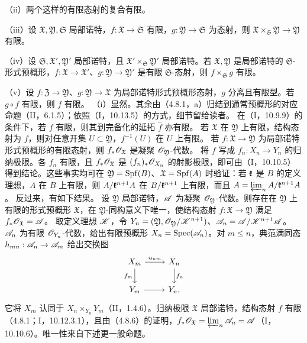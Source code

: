 （ii）两个这样的有限态射的复合有限。

（iii）设 $\mathfrak X,\mathfrak Y,\mathfrak S$ 局部诺特，$f:\mathfrak X\to\mathfrak S$ 有限，$g:\mathfrak Y\to\mathfrak S$ 为态射，则 $\mathfrak X\times_{\mathfrak S}\mathfrak Y\to\mathfrak Y$ 有限。

（iv）设 $\mathfrak S,\mathfrak X',\mathfrak Y'$ 局部诺特，且 $\mathfrak X'\times_{\mathfrak S}\mathfrak Y'$ 局部诺特。若 $\mathfrak X,\mathfrak Y$ 是局部诺特的 $\mathfrak S$-形式预概形，$f:\mathfrak X\to\mathfrak X'$、$g:\mathfrak Y\to\mathfrak Y'$ 是有限 $\mathfrak S$-态射，则 $f\times_{\mathfrak S}g$ 有限。

（v）设 $f:\mathfrak Z\to\mathfrak Y$、$g:\mathfrak Y\to\mathfrak X$ 为局部诺特形式预概形态射，$g$ 分离且有限型。若 $g\circ f$ 有限，则 $f$ 有限。
\eproof
（i）显然。其余由（4.8.1，a）归结到通常预概形的对应命题（II，6.1.5）；依照（I，10.13.5）的方式，细节留给读者。\finishproof
{}
在（I，10.9.9）的条件下，若 $f$ 有限，则其到完备化的延拓 $\widehat f$ 亦有限。
若 $\mathfrak X$ 在 $\mathfrak Y$ 上有限，结构态射为 $f$，则对任意开集 $U\subset\mathfrak Y$，$f^{-1}(U)$ 在 $U$ 上有限。
若 $f:\mathfrak X\to\mathfrak Y$ 为局部诺特形式预概形的有限态射，则 $f_*\mathscr O_{\mathfrak X}$ 是凝聚 $\mathscr O_{\mathfrak Y}$-代数。
\eproof
将 $f$ 写成 $f_n:X_n\to Y_n$ 的归纳极限。各 $f_n$ 有限，且 $f_*\mathscr O_{\mathfrak X}$ 是 $(f_n)_*\mathscr O_{X_n}$ 的射影极限，即可由（I，10.10.5）得到结论。这些事实均可在 $\mathfrak Y=\operatorname{Spf}(B)$、$\mathfrak X=\operatorname{Spf}(A)$ 时验证：若 $\mathfrak k$ 是 $B$ 的定义理想，$A$ 在 $B$ 上有限，则 $A/\mathfrak k^{n+1}A$ 在 $B/\mathfrak k^{n+1}$ 上有限，而且 $A=\varprojlim_nA/\mathfrak k^{n+1}A$。\finishproof
反过来，有如下结果。
设 $\mathfrak Y$ 局部诺特，$\mathscr A$ 为凝聚 $\mathscr O_{\mathfrak Y}$-代数。则存在在 $\mathfrak Y$ 上有限的形式预概形 $\mathfrak X$，在 $\mathfrak Y$-同构意义下唯一，使结构态射 $f:\mathfrak X\to\mathfrak Y$ 满足 $f_*\mathscr O_{\mathfrak X}=\mathscr A$。
\eproof
取定义理想 $\mathscr K$，令 $Y_n=(\mathfrak Y,\mathscr O_{\mathfrak Y}/\mathscr K^{n+1})$、$\mathscr A_n=\mathscr A/\mathscr K^{n+1}\mathscr A$。$\mathscr A_n$ 为有限 $\mathscr O_{Y_n}$-代数，给出有限预概形 $X_n=\operatorname{Spec}(\mathscr A_n)$。对 $m\le n$，典范满同态 $h_{mn}:\mathscr A_n\to\mathscr A_m$ 给出交换图
\[
\begin{tikzcd}
X_m\arrow[r,"u_{nm}"]\arrow[d,"f_m"']&X_n\arrow[d,"f_n"]\\
Y_m\arrow[r]&Y_n,
\end{tikzcd}
\]
它将 $X_m$ 认同于 $X_n\times_{Y_n}Y_m$（II，1.4.6）。归纳极限 $\mathfrak X$ 局部诺特，结构态射 $f$ 有限（4.8.1；I，10.12.3.1），且由（4.8.6）的证明，$f_*\mathscr O_{\mathfrak X}=\varprojlim_n\mathscr A_n=\mathscr A$（I，10.10.6）。唯一性来自下述更一般命题。\finishproof
